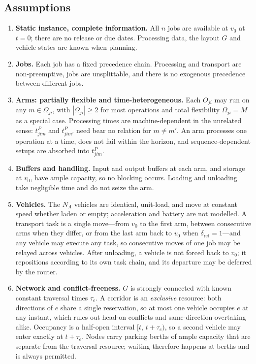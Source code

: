 \documentclass[manuscript,screen,review]{acmart}
\begin{document}
\subsection{Assumptions}
\label{sec:assumptions}

\begin{enumerate}[label=\textbf{A\arabic*.},leftmargin=*,topsep=2pt,itemsep=2pt]
\item \textbf{Static instance, complete information.} All $n$ jobs are available
at $v_0$ at $t=0$; there are no release or due dates. Processing data, the
layout $G$ and vehicle states are known when planning.

\item \textbf{Jobs.} Each job has a fixed precedence chain. Processing and
transport are non-preemptive, jobs are unsplittable, and there is no exogenous
precedence between different jobs.

\item \textbf{Arms: partially flexible and time-heterogeneous.} Each $O_{ji}$
may run on any $m\in\Omega_{ji}$, with $|\Omega_{ji}|\ge 2$ for most operations
and total flexibility $\Omega_{ji}=M$ as a special case. Processing times are
machine-dependent in the unrelated sense: $t^P_{jim}$ and $t^P_{jim'}$ need
bear no relation for $m\neq m'$. An arm processes one operation at a time, does
not fail within the horizon, and sequence-dependent setups are absorbed into
$t^P_{jim}$.

\item \textbf{Buffers and handling.} Input and output buffers at each arm, and
storage at $v_0$, have ample capacity, so no blocking occurs. Loading and
unloading take negligible time and do not seize the arm.

\item \textbf{Vehicles.} The $N_A$ vehicles are identical, unit-load, and move
at constant speed whether laden or empty; acceleration and battery are not
modelled. A transport task is a single move---from $v_0$ to the first arm,
between consecutive arms when they differ, or from the last arm back to $v_0$
when $\delta_{\mathrm{ret}}=1$---and any vehicle may execute any task, so
consecutive moves of one job may be relayed across vehicles. After unloading, a
vehicle is not forced back to $v_0$; it repositions according to its own task
chain, and its departure may be deferred by the router.

\item \textbf{Network and conflict-freeness.} $G$ is strongly connected with
known constant traversal times $\tau_e$. A corridor is an \emph{exclusive}
resource: both directions of $e$ share a single reservation, so at most one
vehicle occupies $e$ at any instant, which rules out head-on conflicts and
same-direction overtaking alike. Occupancy is a half-open interval
$[t,\,t+\tau_e)$, so a second vehicle may enter exactly at $t+\tau_e$. Nodes
carry parking berths of ample capacity that are separate from the traversal
resource; waiting therefore happens at berths and is always permitted.


\end{enumerate}
\end{document}
